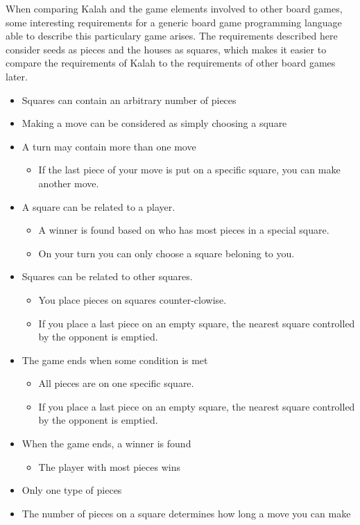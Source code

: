 When comparing Kalah and the game elements involved to other board games, some interesting requirements for a generic board game programming language able to describe this particulary game arises. The requirements described here consider seeds as pieces and the houses as squares, which makes it easier to compare the requirements of Kalah to the requirements of other board games later.
\begin{itemize}[noitemsep]
\item Squares can contain an arbitrary number of pieces
\item Making a move can be considered as simply choosing a square
\item A turn may contain more than one move
	\begin{itemize}[noitemsep]
	\item If the last piece of your move is put on a specific square, you can make another move.
	\end{itemize}
\item A square can be related to a player.
	\begin{itemize}[noitemsep]
	\item A winner is found based on who has most pieces in a special square.
	\item On your turn you can only choose a square beloning to you.
	\end{itemize}
\item Squares can be related to other squares.
	\begin{itemize}[noitemsep]
	\item You place pieces on squares counter-clowise.
	\item If you place a last piece on an empty square, the nearest square controlled by the opponent is emptied.
	\end{itemize}
\item The game ends when some condition is met
	\begin{itemize}[noitemsep]
	\item All pieces are on one specific square.
	\item If you place a last piece on an empty square, the nearest square controlled by the opponent is emptied.
	\end{itemize}
\item When the game ends, a winner is found
	\begin{itemize}[noitemsep]
	\item The player with most pieces wins
	\end{itemize}
\item Only one type of pieces
\item The number of pieces on a square determines how long a move you can make
\end{itemize}
